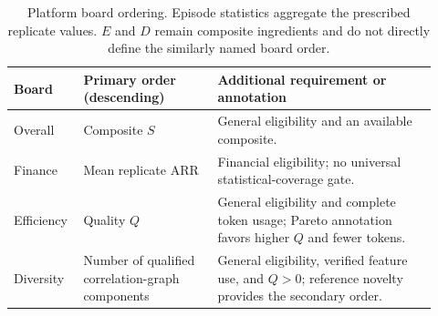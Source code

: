 \begin{table}[ht]
    \centering
    \small
    \caption{Platform board ordering. Episode statistics aggregate the prescribed replicate values. $E$ and $D$ remain composite ingredients and do not directly define the similarly named board order.}
    \label{tab:board_rules}
    \begin{tabular}{@{}>{\raggedright\arraybackslash}p{0.13\linewidth}>{\raggedright\arraybackslash}p{0.30\linewidth}>{\raggedright\arraybackslash}p{0.49\linewidth}@{}}
        \toprule
        Board & Primary order (descending) & Additional requirement or annotation \\
        \midrule
        Overall & Composite $S$ & General eligibility and an available composite. \\
        Finance & Mean replicate ARR & Financial eligibility; no universal statistical-coverage gate. \\
        Efficiency & Quality $Q$ & General eligibility and complete token usage; Pareto annotation favors higher $Q$ and fewer tokens. \\
        Diversity & Number of qualified correlation-graph components & General eligibility, verified feature use, and $Q>0$; reference novelty provides the secondary order. \\
        \bottomrule
    \end{tabular}
\end{table}
